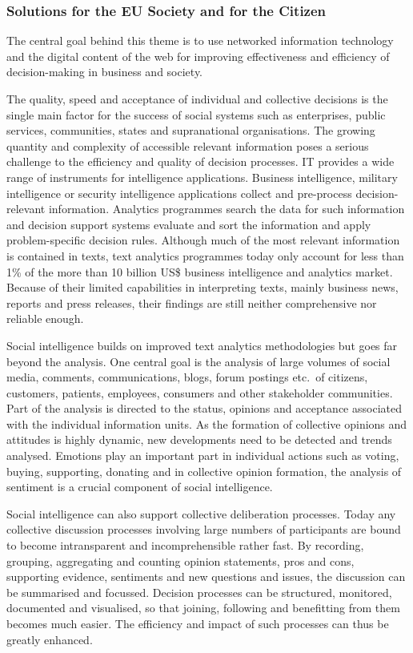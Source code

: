 \documentclass[10pt, plain]{../../metanetpaper}
\begin{document}
\begin{multicols}{2}
\subsubsection{Solutions for the EU Society and for the Citizen}
\label{sec:solutions-eu-society-pt2}

The central goal behind this theme is to use networked information technology and the digital content of the web for improving effectiveness and efficiency of decision-making in business and society. 
 
The quality, speed and acceptance of individual and collective decisions is the single main factor for the success of social systems such as enterprises, public services, communities, states and supranational organisations. The growing quantity and complexity of accessible relevant information poses a serious challenge to the efficiency and quality of decision processes. IT provides a wide range of instruments for intelligence applications. Business intelligence, military intelligence or security intelligence applications collect and pre-process decision-relevant information. Analytics programmes search the data for such information and decision support systems evaluate and sort the information and apply problem-specific decision rules. Although much of the most relevant information is contained in texts, text analytics programmes today only account for less than 1\% of the more than 10 billion US\$ business intelligence and analytics market. Because of their limited capabilities in interpreting texts, mainly business news, reports and press releases, their findings are still neither comprehensive nor reliable enough.
 
Social intelligence builds on improved text analytics methodologies but goes far beyond the analysis. One central goal is the analysis of large volumes of social media, comments, communications, blogs, forum postings etc.~of citizens, customers, patients, employees, consumers and other stakeholder communities. Part of the analysis is directed to the status, opinions and acceptance associated with the individual information units. As the formation of collective opinions and attitudes is highly dynamic, new developments need to be detected and trends analysed. Emotions play an important part in individual actions such as voting, buying, supporting, donating and in collective opinion formation, the analysis of sentiment is a crucial component of social intelligence.  
 
Social intelligence can also support collective deliberation processes. Today any collective discussion processes involving large numbers of participants are bound to become intransparent and incomprehensible rather fast. By recording, grouping, aggregating and counting opinion statements, pros and cons, supporting evidence, sentiments and new questions and issues, the discussion can be summarised and focussed. Decision processes can be structured, monitored, documented and visualised, so that joining, following and benefitting from them becomes much easier. The efficiency and impact of such processes can thus be greatly enhanced.
 

\end{multicols}
\end{document}

